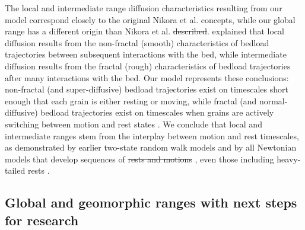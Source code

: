 \documentclass[grl]{agujournal2018}
\providecommand{\DIFadd}[1]{{\protect\color{blue}\uwave{#1}}} %
\providecommand{\DIFdel}[1]{{\protect\color{red}\sout{#1}}}                      %
\providecommand{\DIFaddbegin}{} %
\providecommand{\DIFaddend}{} %
\providecommand{\DIFdelbegin}{} %
\providecommand{\DIFdelend}{} %
\begin{document}
The local and intermediate range diffusion characteristics resulting from our model correspond closely to the original Nikora et al. concepts, while our global range has a different origin than Nikora et al. \DIFdelbegin \DIFdel{described}\DIFdelend \DIFaddbegin \DIFadd{envisioned}\DIFaddend .
\citet{Nikora2001a} explained that local diffusion results from the non-fractal (smooth) characteristics of bedload trajectories between subsequent interactions with the bed,  while intermediate diffusion results from the fractal (rough) characteristics of bedload trajectories after many interactions with the bed.
Our model represents these conclusions: non-fractal (and super-diffusive) bedload trajectories exist on timescales short enough that each grain is either resting or moving, while fractal (and normal-diffusive) bedload trajectories exist on timescales when grains are actively switching between motion and rest states\DIFdelbegin %
\DIFdelend .
We conclude that local and intermediate ranges stem from the interplay between motion and rest timescales, as demonstrated by earlier two-state random walk models \citep{Lisle1998,Lajeunesse2018} and by all Newtonian models that develop sequences of \DIFdelbegin \DIFdel{rests and motions }\DIFdelend \DIFaddbegin \DIFadd{motions and rests }\DIFaddend \citep{Nikora2001a, Bialik2012}, even those including heavy-tailed rests \citep{Fan2016}. 

\subsection{Global and geomorphic ranges with next steps for research}
\end{document}
